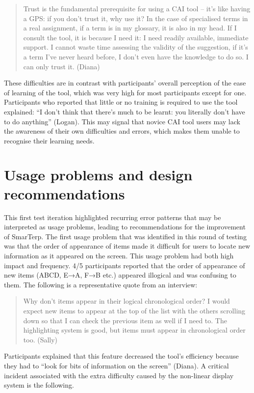 \begin{quote}
    Trust is the fundamental prerequisite for using a CAI tool -- it’s like having a GPS: if you don’t trust it, why use it? In the case of specialised terms in a real assignment, if a term is in my glossary, it is also in my head. If I consult the tool, it is because I need it: I need readily available, immediate support. I cannot waste time assessing the validity of the suggestion, if it’s a term I’ve never heard before, I don’t even have the knowledge to do so. I can only trust it. (Diana)
\end{quote}
These difficulties are in contrast with participants’ overall perception of the ease of learning of the tool, which was very high for most participants except for one. Participants who reported that little or no training is required to use the tool explained: ``I don’t think that there’s much to be learnt: you literally don’t have to do anything'' (Logan). This may signal that novice CAI tool users may lack the awareness of their own difficulties and errors, which makes them unable to recognise their learning needs.


\section{Usage problems and design recommendations}

This first test iteration highlighted recurring error patterns that may be interpreted as usage problems, leading to recommendations for the improvement of SmarTerp. The first usage problem that was identified in this round of testing was that the order of appearance of items made it difficult for users to locate new information as it appeared on the screen. This usage problem had both high impact and frequency. 4/5 participants reported that the order of appearance of new items (ABCD, E→A, F→B etc.) appeared illogical and was confusing to them. The following is a representative quote from an interview:

\begin{quote}
    Why don’t items appear in their logical chronological order? I would expect new items to appear at the top of the list with the others scrolling down so that I can check the previous item as well if I need to. The highlighting system is good, but items must appear in chronological order too. (Sally)
\end{quote}
Participants explained that this feature decreased the tool’s efficiency because they had to ``look for bits of information on the screen'' (Diana). A critical incident associated with the extra difficulty caused by the non-linear display system is the following.

